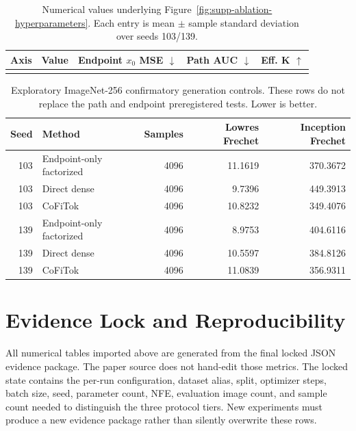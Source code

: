 \documentclass[letterpaper]{article}
\newcommand{\method}{CoFiTok}
\begin{document}
\begin{table}[t]
  \centering
  \small
  \caption{Numerical values underlying
  Figure~\ref{fig:supp-ablation-hyperparameters}. Each entry is mean $\pm$
  sample standard deviation over seeds 103/139.}
  \label{tab:supp-hyperparameter-values}
  \begin{tabular}{lrrrr}
    \toprule
    Axis & Value & Endpoint $x_0$ MSE $\downarrow$ & Path AUC $\downarrow$ & Eff. K $\uparrow$ \\
    \midrule
    \\
    \bottomrule
  \end{tabular}
\end{table}

\begin{table}[t]
  \centering
  \scriptsize
  \caption{Exploratory ImageNet-256 confirmatory generation controls. These rows do not replace the path and endpoint preregistered tests. Lower is better.}
  \label{tab:supp-imagenet256-generation-controls}
  \begin{tabular}{rlrrr}
    \toprule
    Seed & Method & Samples & Lowres Frechet & Inception Frechet \\
    \midrule
    103 & Endpoint-only factorized & 4096 & 11.1619 & 370.3672 \\
    103 & Direct dense & 4096 & 9.7396 & 449.3913 \\
    103 & \method & 4096 & 10.8232 & 349.4076 \\
    139 & Endpoint-only factorized & 4096 & 8.9753 & 404.6116 \\
    139 & Direct dense & 4096 & 10.5597 & 384.8126 \\
    139 & \method & 4096 & 11.0839 & 356.9311 \\
    \bottomrule
  \end{tabular}
\end{table}

\section{Evidence Lock and Reproducibility}

All numerical tables imported above are generated from the final locked JSON
evidence package. The paper source does not hand-edit those metrics. The locked
state contains the per-run configuration, dataset alias, split, optimizer
steps, batch size, seed, parameter count, NFE, evaluation image count, and
sample count needed to distinguish the three protocol tiers. New experiments
must produce a new evidence package rather than silently overwrite these rows.
\end{document}
